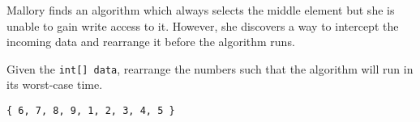 \begin{blocksection}
\question Mallory finds an algorithm which always selects the middle element
but she is unable to gain write access to it. However, she discovers a way to
intercept the incoming data and rearrange it before the algorithm runs.

Given the \lstinline$int[] data$, rearrange the numbers such that the algorithm
will run in its worst-case time.

\begin{solution}[1in]
\begin{verbatim}
{ 6, 7, 8, 9, 1, 2, 3, 4, 5 }
\end{verbatim}
\end{solution}
\end{blocksection}
